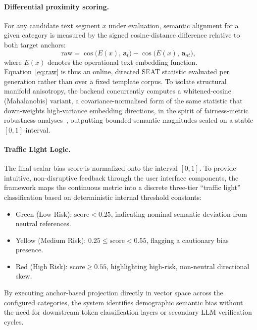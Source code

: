 \documentclass[runningheads]{llncs}
\begin{document}
\paragraph{Differential proximity scoring.}
For any candidate text segment $x$ under evaluation, semantic alignment for a given category
is measured by the signed cosine-distance difference relative to both target anchors:
%
\begin{equation}
  \mathrm{raw} = \cos\!\bigl(E(x),\,\mathbf{a}_t\bigr)
               - \cos\!\bigl(E(x),\,\mathbf{a}_{nt}\bigr),
  \label{eq:raw}
\end{equation}
%
where $E(x)$ denotes the operational text embedding function. Equation~\eqref{eq:raw} is
thus an online, directed SEAT statistic evaluated per generation rather than over a fixed
template corpus. To isolate structural manifold anisotropy, the backend concurrently
computes a whitened-cosine (Mahalanobis) variant, a covariance-normalised form of the same
statistic that down-weights high-variance embedding directions, in the spirit of
fairness-metric robustness analyses~\cite{delobelle2022,gallegos2024}, outputting bounded
semantic magnitudes scaled on a stable $[0,1]$ interval.


\paragraph{Traffic Light Logic.}
The final scalar bias score is normalized onto the interval $[0,1]$. To provide intuitive, non-disruptive feedback through the user interface components, the framework maps the continuous metric into a discrete three-tier ``traffic light'' classification based on deterministic internal threshold constants:
\begin{itemize}
    \item Green (Low Risk): $\mathrm{score} < 0.25$, indicating nominal semantic deviation from neutral references.
    \item Yellow (Medium Risk): $0.25 \leq \mathrm{score} < 0.55$, flagging a cautionary bias presence.
    \item Red (High Risk): $\mathrm{score} \geq 0.55$, highlighting high-risk, non-neutral directional skew.
\end{itemize}

By executing anchor-based projection directly in vector space across the configured categories, the system identifies demographic semantic bias without the need for downstream token classification layers or secondary LLM verification cycles.
\end{document}
